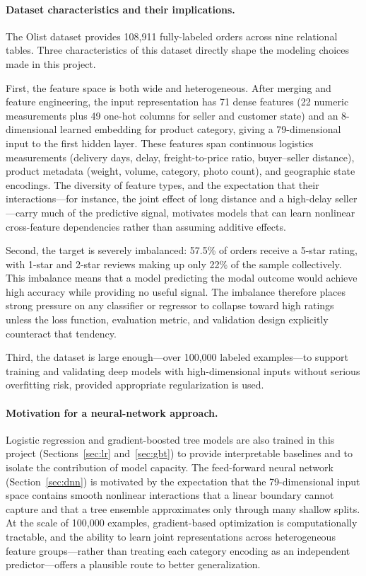 \documentclass[11pt]{article}
\begin{document}
\paragraph{Dataset characteristics and their implications.}
The Olist dataset provides 108{,}911 fully-labeled orders across nine relational tables.
Three characteristics of this dataset directly shape the modeling choices made in this project.

First, the feature space is both wide and heterogeneous.
After merging and feature engineering, the input representation has 71 dense features (22 numeric measurements plus 49 one-hot columns for seller and customer state) and an 8-dimensional learned embedding for product category, giving a 79-dimensional input to the first hidden layer. These features span continuous logistics measurements (delivery days, delay, freight-to-price ratio, buyer--seller distance), product metadata (weight, volume, category, photo count), and geographic state encodings.
The diversity of feature types, and the expectation that their interactions---for instance, the joint effect of long distance and a high-delay seller---carry much of the predictive signal, motivates models that can learn nonlinear cross-feature dependencies rather than assuming additive effects.

Second, the target is severely imbalanced: 57.5\% of orders receive a 5-star rating, with 1-star and 2-star reviews making up only 22\% of the sample collectively.
This imbalance means that a model predicting the modal outcome would achieve high accuracy while providing no useful signal.
The imbalance therefore places strong pressure on any classifier or regressor to collapse toward high ratings unless the loss function, evaluation metric, and validation design explicitly counteract that tendency.

Third, the dataset is large enough---over 100{,}000 labeled examples---to support training and validating deep models with high-dimensional inputs without serious overfitting risk, provided appropriate regularization is used.

\paragraph{Motivation for a neural-network approach.}
Logistic regression and gradient-boosted tree models are also trained in this project (Sections~\ref{sec:lr} and~\ref{sec:gbt}) to provide interpretable baselines and to isolate the contribution of model capacity.
The feed-forward neural network (Section~\ref{sec:dnn}) is motivated by the expectation that the 79-dimensional input space contains smooth nonlinear interactions that a linear boundary cannot capture and that a tree ensemble approximates only through many shallow splits.
At the scale of 100{,}000 examples, gradient-based optimization is computationally tractable, and the ability to learn joint representations across heterogeneous feature groups---rather than treating each category encoding as an independent predictor---offers a plausible route to better generalization.
\end{document}
